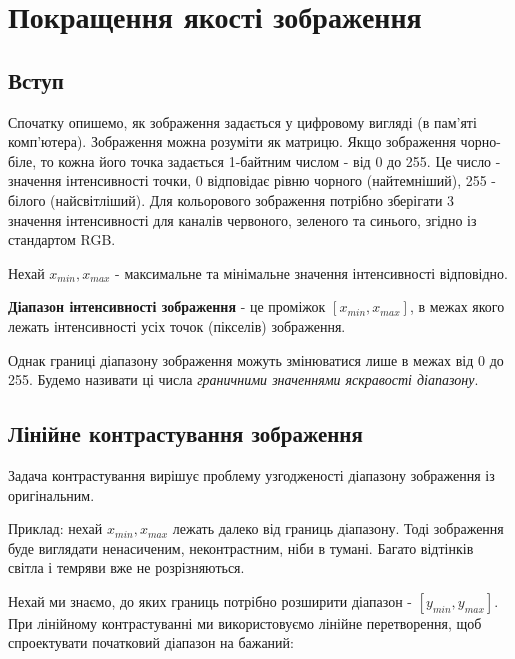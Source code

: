 \chapter{Покращення якості зображення}


\section{Вступ}
Спочатку опишемо, як зображення задається у цифровому вигляді (в пам'яті комп'ютера).
Зображення можна розуміти як матрицю. Якщо зображення чорно-біле, то кожна його точка задається 
1-байтним числом - від 0 до 255. 
Це число - значення інтенсивності точки, 0 відповідає рівню чорного (найтемніший), 255 - білого (найсвітліший). 
Для кольорового зображення потрібно зберігати 3 значення інтенсивності для каналів червоного, 
зеленого та синього, згідно із стандартом RGB.




\begin{definition}
 Нехай $x_{min}, x_{max}$ - максимальне та мінімальне значення інтенсивності відповідно.
 
 {\bfseries Діапазон інтенсивності зображення} - це проміжок $[x_{min}, x_{max}]$, 
 в межах якого лежать інтенсивності усіх точок (пікселів) зображення.
\end{definition}

Однак границі діапазону зображення можуть змінюватися лише в межах від 0 до 255. 
Будемо називати ці числа {\itshape граничними значеннями яскравості діапазону}.

\section{Лінійне контрастування зображення}

Задача контрастування вирішує проблему узгодженості діапазону 
зображення із оригінальним.

Приклад: нехай $x_{min}, x_{max}$ лежать далеко від границь діапазону. 
Тоді зображення буде виглядати ненасиченим, неконтрастним, ніби в тумані. 
Багато відтінків світла і темряви вже не розрізняються.

Нехай ми знаємо, до яких границь потрібно розширити діапазон - $[y_{min}, y_{max}]$.
При лінійному контрастуванні ми використовуємо лінійне перетворення, щоб спроектувати початковий діапазон на бажаний:

